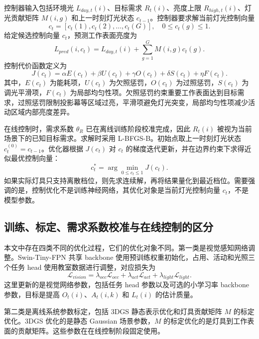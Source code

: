 \documentclass[UTF8,a4paper,zihao=-4]{ctexart}
\begin{document}
控制器输入包括环境光 $L_{day,t}(i)$、目标需求 $R_t(i)$、亮度上限 $R_{high,t}(i)$、灯光贡献矩阵 $M(i,g)$ 和上一时刻灯光状态 $c_{t-1}$。控制器要求解当前灯光控制向量
\begin{equation}
c_t=[c_t(1),c_t(2),\ldots,c_t(G)],\quad 0\leq c_t(g)\leq 1.
\end{equation}
给定候选控制向量 $c_t$，预测工作表面亮度为
\begin{equation}
L_{pred}(i,c_t)=L_{day,t}(i)+\sum_{g=1}^{G}M(i,g)c_t(g).
\end{equation}
控制代价函数定义为
\begin{equation}
J(c_t)=\alpha E(c_t)+\beta U(c_t)+\gamma O(c_t)+\delta S(c_t)+\eta F(c_t).
\end{equation}
其中，$E(c_t)$ 为能耗项，$U(c_t)$ 为欠照惩罚，$O(c_t)$ 为过照惩罚，$S(c_t)$ 为调光平滑项，$F(c_t)$ 为局部均匀性项。欠照惩罚约束重要工作表面达到目标需求，过照惩罚限制投影幕等区域过亮，平滑项避免灯光突变，局部均匀性项减少活动区域内部亮度差异。

在线控制时，需求系数 $\theta_R$ 已在离线训练阶段校准完成，因此 $R_t(i)$ 被视为当前场景下的已知目标需求。求解时采用 L-BFGS-B。初始点取上一时刻灯光状态 $c_t^{(0)}=c_{t-1}$。优化器根据 $J(c_t)$ 对 $c_t$ 的梯度迭代更新，并在边界约束下求得近似最优控制向量：
\begin{equation}
c_t^*=\arg\min_{0\leq c_t\leq 1}J(c_t).
\end{equation}
如果实际灯具只支持离散档位，则先求连续解，再将结果量化到最近档位。需要强调的是，控制优化不是训练神经网络，其优化对象是当前灯光控制向量 $c_t$，不是模型参数。

\subsection{训练、标定、需求系数校准与在线控制的区分}

本文中存在四类不同的优化过程，它们的优化对象不同。第一类是视觉感知网络调整。Swin-Tiny-FPN 共享 backbone 使用预训练权重初始化，占用、活动和光照三个任务 head 使用教室数据进行调整，对应损失为
\begin{equation}
\mathcal{L}_{vision}=\lambda_{occ}\mathcal{L}_{occ}+\lambda_{act}\mathcal{L}_{act}+\lambda_{light}\mathcal{L}_{light}.
\end{equation}
这里更新的是视觉网络参数，包括任务 head 参数以及可选的小学习率 backbone 参数，目标是提高 $O_t(i)$、$A_t(i,k)$ 和 $L_t(i)$ 的估计质量。

第二类是离线系统参数标定，包括 3DGS 静态表示优化和灯具贡献矩阵 $M$ 的标定优化。3DGS 优化的是静态 Gaussian 场景参数，$M$ 的标定优化的是灯具到工作表面的贡献矩阵。这些参数在在线控制阶段固定使用。
\end{document}
